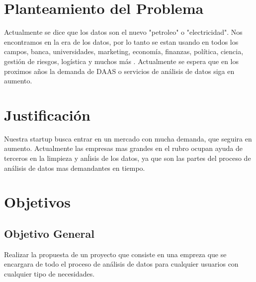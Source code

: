 \documentclass[12pt,a4paper,openright]{article}
\begin{document}
\section{Planteamiento del Problema}

Actualmente se dice que los datos son el nuevo "petroleo" o "electricidad". Nos encontramos en la era de los datos, por lo tanto se estan usando en todos los campos, banca, universidades, marketing, econom\'ia, finanzas, pol\'itica, ciencia, gesti\'on de riesgos, log\'istica y muchos m\'as . Actualmente se espera que en los proximos años la demanda de DAAS o servicios de an\'alisis de datos siga en aumento.



\section{Justificación}


Nuestra startup busca entrar en un mercado con mucha demanda, que seguira en aumento. Actualmente las empresas mas grandes en el rubro ocupan ayuda de terceros en la limpieza y an\'lisis de los datos, ya que son las partes del proceso de an\'alisis de datos mas demandantes en tiempo.








\section{Objetivos}
\subsection{Objetivo General}
Realizar la propuesta de un proyecto que consiste en una empreza que se encargara de todo el proceso de an\'alisis de datos para cualquier usuarios con cualquier tipo de necesidades.
\end{document}
